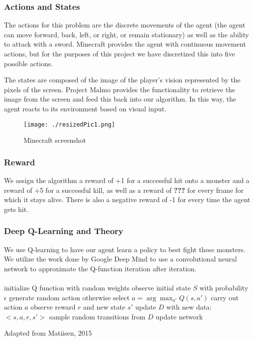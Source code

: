 \documentclass{article}
\begin{document}
\begin{multicols}{2}
\subsubsection{Actions and States}

The actions for this problem are the discrete movements of the agent (the agent can move forward, back, left, or right, or remain stationary) as well as the ability to attack with a sword.
Minecraft provides the agent with continuous movement actions, but for the purposes of this project we have discretized this into five possible actions.

The states are composed of the image of the player's vision represented by the pixels of the screen. Project Malmo provides the functionality to retrieve the image from the screen and feed this back into our algorithm. In this way, the agent reacts to its environment based on visual input.

\begin{figure}[H]
\caption{Minecraft screenshot}
\centering
\texttt{[image: ./resizedPic1.png]}
\end{figure}

\subsubsection{Reward}

We assign the algorithm a reward of +1 for a successful hit onto a monster and a reward of +5 for a successful kill, as well as a reward of {\bf???} for every frame for which it stays alive. There is also a negative reward of -1 for every time the agent gets hit.

\subsubsection{Deep Q-Learning and Theory}

We use Q-learning to have our agent learn a policy to best fight these monsters.  We utilize the work done by Google Deep Mind to use a convolutional neural network to approximate the Q-function iteration after iteration.
\paragraph{}


\begin{algorithm*}[H]
     \SetAlgoLined
     initialize Q function with random weights \;
     observe initial state $S$ \;
      {
        with probability $\epsilon$ generate random action \;
        otherwise select $a = \arg\max_{a'} Q(s,a')$ \;
        carry out action $a$ \;
        observe reward $r$ and new state $s'$ \;
        update $D$ with new data: $<s,a,r,s'>$ \;
        sample random transitions from $D$ \;
        update network \;
     }
     \caption{Adapted from Matiisen, 2015}
\end{algorithm*}




\end{multicols}
\end{document}
